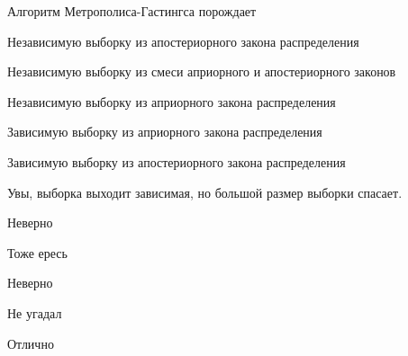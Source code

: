 
\begin{question}
Алгоритм Метрополиса-Гастингса порождает
\begin{answerlist}
  \item Независимую выборку из апостериорного закона распределения
  \item Независимую выборку из смеси априорного и апостериорного законов
  \item Независимую выборку из априорного закона распределения
  \item Зависимую выборку из априорного закона распределения
  \item Зависимую выборку из апостериорного закона распределения
\end{answerlist}
\end{question}

\begin{solution}
Увы, выборка выходит зависимая, но большой размер выборки спасает.
\begin{answerlist}
  \item Неверно
  \item Тоже ересь
  \item Неверно
  \item Не угадал
  \item Отлично
\end{answerlist}
\end{solution}

